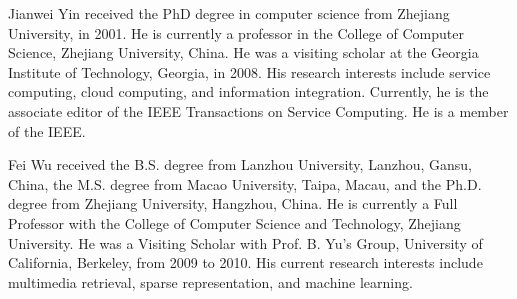 \documentclass[journal,comsoc]{IEEEtran}
\begin{document}
\begin{IEEEbiography}{Jianwei Yin} received the PhD degree in computer science from Zhejiang University, in 2001. He is currently a professor in the College of Computer Science, Zhejiang University, China. He was a visiting scholar at the Georgia Institute of Technology, Georgia, in 2008. His research interests include service computing, cloud computing, and information integration. Currently, he is the associate editor of the IEEE Transactions on Service Computing. He is a member of the IEEE.
\end{IEEEbiography}

\begin{IEEEbiography}{Fei Wu} received the B.S. degree from Lanzhou University, Lanzhou, Gansu, China, the M.S. degree from Macao University, Taipa, Macau, and the Ph.D. degree from Zhejiang University, Hangzhou, China. He is currently a Full Professor with the College of Computer Science and Technology, Zhejiang University. He was a Visiting Scholar with Prof. B. Yu's Group, University of California, Berkeley, from 2009 to 2010. His current research interests include multimedia retrieval, sparse representation, and machine learning.
\end{IEEEbiography}
\end{document}
